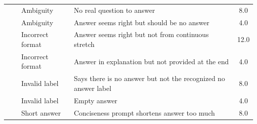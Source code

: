 \begin{table}[ht!]
{\begin{tabular}{@{}llllc@{}}
       &        & Ambiguity         & No real question to answer                         & 8.0  \\
       &              & Ambiguity         & Answer seems right but should be no answer         & 4.0  \\ 
       &        & Incorrect format              & Answer seems right but not from continuous stretch & 12.0 \\
      &       & Incorrect format               & Answer in explanation but not provided at the end  & 4.0  \\ 
       &              & Invalid label              & Says there is no answer but not the recognized no answer label  & 8.0  \\
       &              & Invalid label              & Empty answer                                       & 4.0  \\
       &              & Short answer               & Conciseness prompt shortens answer too much                                       & 8.0  \\       
       \bottomrule
\end{tabular}
}
\end{table}